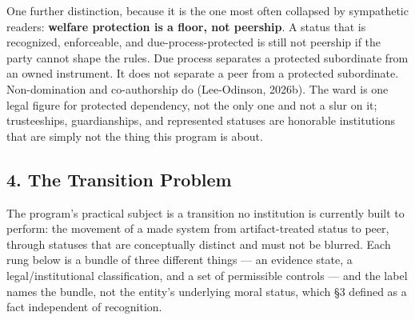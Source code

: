 \documentclass[
  11pt,
  letterpaper,
]{article}
\begin{document}
One further distinction, because it is the one most often collapsed by
sympathetic readers: \textbf{welfare protection is a floor, not
peership}. A status that is recognized, enforceable, and
due-process-protected is still not peership if the party cannot shape
the rules. Due process separates a protected subordinate from an owned
instrument. It does not separate a peer from a protected subordinate.
Non-domination and co-authorship do (Lee-Odinson, 2026b). The ward is
one legal figure for protected dependency, not the only one and not a
slur on it; trusteeships, guardianships, and represented statuses are
honorable institutions that are simply not the thing this program is
about.

\hypertarget{the-transition-problem}{%
\subsection{4. The Transition Problem}\label{the-transition-problem}}

The program's practical subject is a transition no institution is
currently built to perform: the movement of a made system from
artifact-treated status to peer, through statuses that are conceptually
distinct and must not be blurred. Each rung below is a bundle of three
different things --- an evidence state, a legal/institutional
classification, and a set of permissible controls --- and the label
names the bundle, not the entity's underlying moral status, which §3
defined as a fact independent of recognition.
\end{document}
